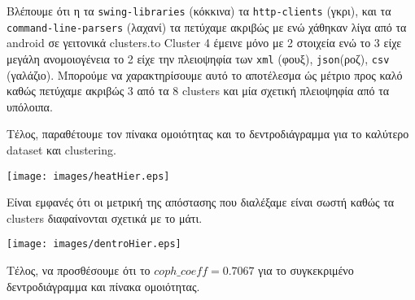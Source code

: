 Βλέπουμε ότι η τα \texttt{swing-libraries} (κόκκινα) τα \texttt{http-clients} (γκρι), 
και τα \texttt{command-line-parsers} (λαχανί) τα πετύχαμε ακριβώς με ενώ χάθηκαν 
λίγα από τα android σε γειτονικά clusters.to Cluster 4 έμεινε μόνο με 2 στοιχεία ενώ το 3 είχε μεγάλη ανομοιογένεια το 2 είχε την πλειοψηφία των \texttt{xml} (φουξ), \texttt{json}(ροζ), \texttt{csv} (γαλάζιο).
Μπορούμε να χαρακτηρίσουμε αυτό το αποτέλεσμα ώς μέτριο προς καλό
καθώς πετύχαμε ακριβώς 3 από τα 8 clusters και μία σχετική πλειοψηφία από τα υπόλοιπα.

Τέλος, παραθέτουμε τον πίνακα ομοιότητας και το δεντροδιάγραμμα για το καλύτερο dataset και clustering.

\noindent\begin{minipage}{\linewidth}
    \centering
    \texttt{[image: images/heatHier.eps]}
    \label{fig:Heat}
\end{minipage}

Είναι εμφανές ότι οι μετρική της απόστασης που διαλέξαμε είναι σωστή
καθώς τα clusters διαφαίνονται σχετικά με το μάτι.

\noindent\begin{minipage}{\linewidth}
    \centering
    \texttt{[image: images/dentroHier.eps]}
    \label{fig:Dentro}
\end{minipage}

Τέλος, να προσθέσουμε ότι το $coph\_coeff = 0.7067$ για το συγκεκριμένο δεντροδιάγραμμα και πίνακα ομοιότητας.
